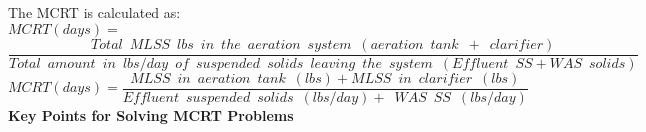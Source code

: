 \vspace{0.2cm}
The MCRT is calculated as:\\  
\vspace{0.2cm}
$MCRT(days) = $\\
$\dfrac{Total \enspace MLSS \enspace lbs \enspace in \enspace the \enspace aeration \enspace system \enspace (aeration \enspace tank \enspace + \enspace clarifier)}{Total \enspace amount \enspace in \enspace lbs/day \enspace of \enspace suspended \enspace solids \enspace leaving  \enspace the \enspace system \enspace(Effluent\enspace SS+ WAS \enspace solids)}$\\
\vspace{0.4cm} 
$MCRT (days) = \dfrac{MLSS \enspace in \enspace aeration \enspace tank \enspace (lbs)+MLSS \enspace in \enspace clarifier \enspace (lbs)}{Effluent \enspace suspended \enspace solids \enspace (lbs/day)+\enspace WAS \enspace SS \enspace (lbs/day)}$\\
\vspace{0.3cm}
\textbf{Key Points for Solving MCRT Problems}\\
